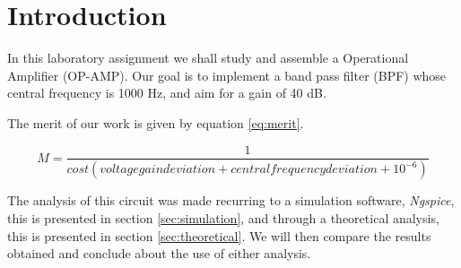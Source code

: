 \section{Introduction}
\label{sec:introduction}

\par In this laboratory assignment we shall study and assemble a Operational Amplifier (OP-AMP). Our goal is to implement a band pass filter (BPF) whose central frequency is 1000 Hz, and aim for a gain of 40 dB.

\par The merit of our work is given by equation \ref{eq:merit}.



\begin{equation}
    M = \frac{1}{cost ( voltagegaindeviation + centralfrequencydeviation + 10^{-6})}
    \label{eq:merit}
\end{equation}



The analysis of this circuit was made recurring to a simulation software, \emph{Ngspice}, this is presented in section \ref{sec:simulation}, and through a theoretical analysis, this is presented in section \ref{sec:theoretical}. We will then compare the results obtained and conclude about the use of either analysis.

